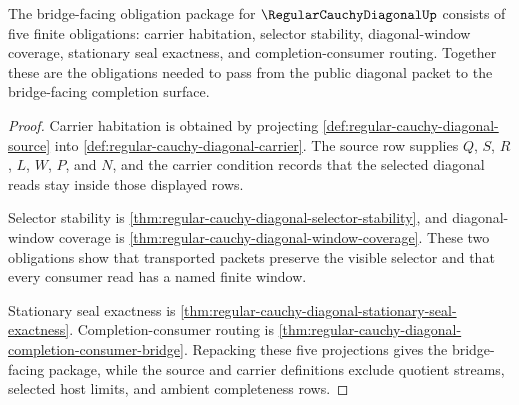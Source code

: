 \begin{theorem}
\label{thm:regular-cauchy-diagonal-bridge-obligation-package}
The bridge-facing obligation package for $\RegularCauchyDiagonalUp$ consists of five finite obligations: carrier habitation, selector stability, diagonal-window coverage, stationary seal exactness, and completion-consumer routing. Together these are the obligations needed to pass from the public diagonal packet to the bridge-facing completion surface.
\end{theorem}
\begin{proof}
Carrier habitation is obtained by projecting \autoref{def:regular-cauchy-diagonal-source} into \autoref{def:regular-cauchy-diagonal-carrier}. The source row supplies $Q$, $S$, $R$, $L$, $W$, $P$, and $N$, and the carrier condition records that the selected diagonal reads stay inside those displayed rows.

Selector stability is \autoref{thm:regular-cauchy-diagonal-selector-stability}, and diagonal-window coverage is \autoref{thm:regular-cauchy-diagonal-window-coverage}. These two obligations show that transported packets preserve the visible selector and that every consumer read has a named finite window.

Stationary seal exactness is \autoref{thm:regular-cauchy-diagonal-stationary-seal-exactness}. Completion-consumer routing is \autoref{thm:regular-cauchy-diagonal-completion-consumer-bridge}. Repacking these five projections gives the bridge-facing package, while the source and carrier definitions exclude quotient streams, selected host limits, and ambient completeness rows.
\end{proof}

